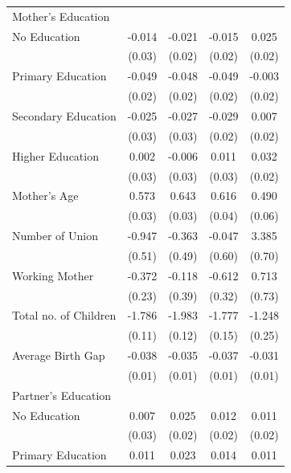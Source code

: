 \begin{longtable}{l*{4}{c}}
\multicolumn{5}{l}{Mother's Education} \\
\hspace{1em}No Education & -0.014 & -0.021 & -0.015 & 0.025 \\
                    & (0.03) & (0.02) & (0.02) & (0.02) \\
\hspace{1em}Primary Education & -0.049\sym{**} & -0.048\sym{**} & -0.049\sym{**} & -0.003 \\
                    & (0.02) & (0.02) & (0.02) & (0.02) \\
\hspace{1em}Secondary Education & -0.025 & -0.027 & -0.029 & 0.007 \\
                    & (0.03) & (0.03) & (0.02) & (0.02) \\
\hspace{1em}Higher Education & 0.002 & -0.006 & 0.011 & 0.032 \\
                    & (0.03) & (0.03) & (0.03) & (0.02) \\
Mother's Age & 0.573\sym{***} & 0.643\sym{***} & 0.616\sym{***} & 0.490\sym{***} \\
                    & (0.03) & (0.03) & (0.04) & (0.06) \\
Number of Union & -0.947\sym{*} & -0.363 & -0.047 & 3.385\sym{***} \\
                    & (0.51) & (0.49) & (0.60) & (0.70) \\
Working Mother & -0.372 & -0.118 & -0.612\sym{*} & 0.713 \\
                    & (0.23) & (0.39) & (0.32) & (0.73) \\
Total no. of Children & -1.786\sym{***} & -1.983\sym{***} & -1.777\sym{***} & -1.248\sym{***} \\
                    & (0.11) & (0.12) & (0.15) & (0.25) \\
Average Birth Gap & -0.038\sym{***} & -0.035\sym{***} & -0.037\sym{***} & -0.031\sym{***} \\
                    & (0.01) & (0.01) & (0.01) & (0.01) \\
\multicolumn{5}{l}{Partner's Education} \\
\hspace{1em}No Education & 0.007 & 0.025 & 0.012 & 0.011 \\
                    & (0.03) & (0.02) & (0.02) & (0.02) \\
\hspace{1em}Primary Education & 0.011 & 0.023 & 0.014 & 0.011 \\

\end{longtable}
